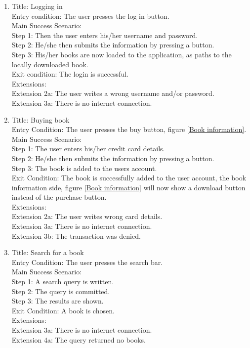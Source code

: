 \documentclass[12pt]{article}
\begin{document}
\begin{enumerate}
\item 
Title: Logging in\\
Entry condition: The user presses the log in button.\\
Main Success Scenario:\\
  Step 1: Then the user enters his/her username and password.\\
  Step 2: He/she then submits the information by pressing a button.\\
  Step 3: His/her books are now loaded to the application, as paths to the locally downloaded book.\\
Exit condition: The login is successful.\\
Extensions:\\
  Extension 2a: The user writes a wrong username and/or password.\\
  Extension 3a: There is no internet connection.\\
\item 
Title: Buying book\\
Entry Condition: The user presses the buy button, figure \ref{Book information}.\\
Main Success Scenario:\\
  Step 1: The user enters his/her credit card details.\\
  Step 2: He/she then submits the information by pressing a button.\\
  Step 3: The book is added to the users account.\\
Exit Condition: The book is successfully added to the user account, the book information side, figure \ref{Book information} will now show a download button instead of the purchase button.\\  
Extensions:\\
  Extension 2a: The user writes wrong card details.\\
  Extension 3a: There is no internet connection.\\
  Extension 3b: The transaction was denied.\\
\item 
Title: Search for a book\\
Entry Condition: The user presses the search bar.\\
Main Success Scenario:\\
  Step 1: A search query is written.\\
  Step 2: The query is committed.\\
  Step 3: The results are shown.\\
  Exit Condition: A book is chosen.\\
Extensions:\\
  Extension 3a: There is no internet connection.\\
  Extension 4a: The query returned no books.\\
\end{enumerate}
\end{document}
